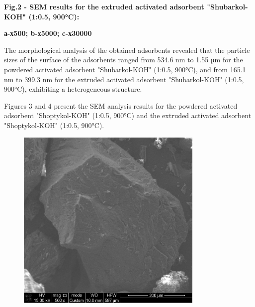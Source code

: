 
{\bfseries Fig.2 - SEM results for the extruded activated adsorbent
"Shubarkol-KOH" (1:0.5, 900°C):}

{\bfseries а-х500; b-х5000; c-х30000}

The morphological analysis of the obtained adsorbents revealed that the
particle sizes of the surface of the adsorbents ranged from 534.6 nm to
1.55 µm for the powdered activated adsorbent "Shubarkol-KOH" (1:0.5,
900°C), and from 165.1 nm to 399.3 nm for the extruded activated
adsorbent "Shubarkol-KOH" (1:0.5, 900°C), exhibiting a heterogeneous
structure.

Figures 3 and 4 present the SEM analysis results for the powdered
activated adsorbent "Shoptykol-KOH" (1:0.5, 900°C) and the extruded
activated adsorbent "Shoptykol-KOH" (1:0.5, 900°C).

\begin{figure}[H]
	\centering
	\includegraphics[width=0.8\textwidth]{media/chem2/image15}
	\caption*{}
\end{figure}

